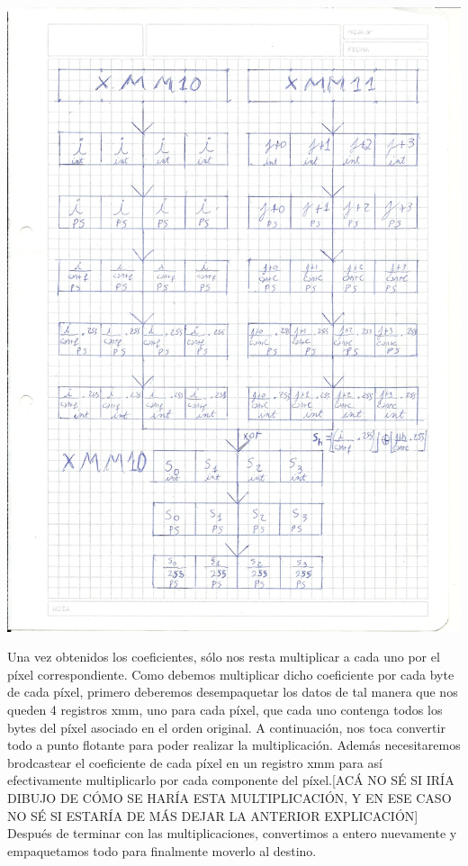 \documentclass[a4paper]{article}
\begin{document}
\includegraphics[scale=0.23]{Dibujos/S1.jpg}


Una vez obtenidos los coeficientes, sólo nos resta multiplicar a cada uno por el píxel correspondiente. Como debemos multiplicar dicho coeficiente por cada byte de cada píxel, primero deberemos desempaquetar los datos de tal manera que nos queden 4 registros xmm, uno para cada píxel, que cada uno contenga todos los bytes del píxel asociado en el orden original. A continuación, nos toca convertir todo a punto flotante para poder realizar la multiplicación. Además necesitaremos brodcastear el coeficiente de cada píxel en un registro xmm para así efectivamente multiplicarlo por cada componente del píxel.[ACÁ NO SÉ SI IRÍA DIBUJO DE CÓMO SE HARÍA ESTA MULTIPLICACIÓN, Y EN ESE CASO NO SÉ SI ESTARÍA DE MÁS DEJAR LA ANTERIOR EXPLICACIÓN] Después de terminar con las multiplicaciones, convertimos a entero nuevamente y empaquetamos todo para finalmente moverlo al destino.
\end{document}
